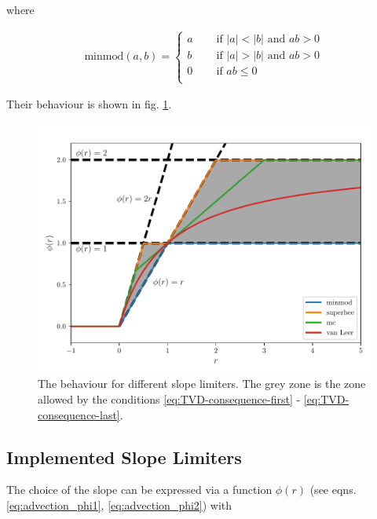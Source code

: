 where

\begin{align}
	\mathrm{minmod}(a, b) = 
		\begin{cases}
			a	& \quad \text{ if } |a| < |b| \text{ and } ab > 0\\
			b	& \quad \text{ if } |a| > |b| \text{ and } ab > 0\\
			0	& \quad \text{ if } ab \leq 0\\
		\end{cases}		
\end{align}



Their behaviour is shown in fig. \ref{fig:limiters-r-phi}.



\begin{figure}[H]
	\centering
	\includegraphics[width=.9\textwidth]{./figures/limiters.pdf}%
	\caption{
		\label{fig:limiters-r-phi}
		The behaviour for different slope limiters. The grey zone is the zone allowed by the conditions \ref{eq:TVD-consequence-first}  - \ref{eq:TVD-consequence-last}.
	}
\end{figure}








\subsection{ Implemented Slope Limiters}


The choice of the slope can be expressed via a function $\phi(r)$ (see eqns. \ref{eq:advection_phi1}, \ref{eq:advection_phi2}) with 


